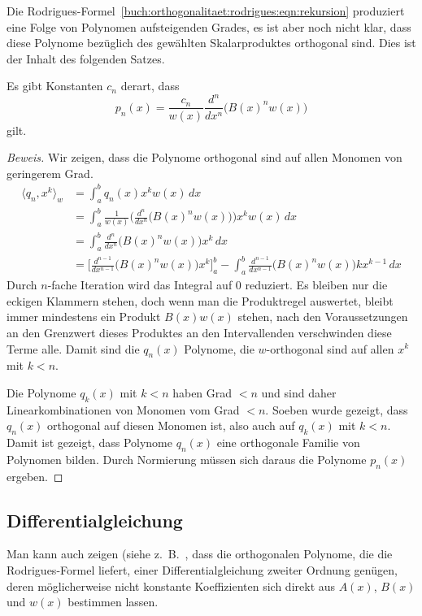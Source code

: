 Die Rodrigues-Formel~\eqref{buch:orthogonalitaet:rodrigues:eqn:rekursion}
produziert eine Folge von Polynomen aufsteigenden Grades, es ist aber
noch nicht klar, dass diese Polynome bezüglich des gewählten Skalarproduktes
orthogonal sind.
Dies ist der Inhalt des folgenden Satzes.

\begin{satz}
%
Es gibt Konstanten $c_n$ derart, dass
\[
p_n(x)
=
\frac{c_n}{w(x)} \frac{d^n}{dx^n} \bigl(B(x)^n w(x)\bigr) 
\]
gilt.
\end{satz}

\begin{proof}[Beweis]
Wir zeigen, dass die Polynome orthogonal sind auf allen Monomen
von geringerem Grad.
\begin{align*}
\langle q_n, x^k\rangle_w
&=
\int_a^b q_n(x)x^kw(x)\,dx
\\
&=
\int_a^b \frac{1}{w(x)}
\biggl(\frac{d^n}{dx^n}\bigl(B(x)^n w(x)\bigr)\biggr)
x^k w(x)\,dx
\\
&=
\int_a^b \frac{d^n}{dx^n}\bigl(B(x)^n w(x)\bigr) x^k \,dx
\\
&=
\biggl[\frac{d^{n-1}}{dx^{n-1}}\bigl(B(x)^n w(x)\bigr) x^k \biggr]_a^b
-
\int_a^b \frac{d^{n-1}}{dx^{n-1}}\bigl(B(x)^n w(x)\bigr)kx^{k-1}\,dx
\end{align*}
Durch $n$-fache Iteration wird das Integral auf $0$ reduziert.
Es bleiben nur die eckigen Klammern stehen, doch wenn man die Produktregel
auswertet, bleibt immer mindestens ein Produkt $B(x)w(x)$ stehen,
nach den Voraussetzungen an den Grenzwert dieses Produktes an den
Intervallenden verschwinden diese Terme alle.
Damit sind die $q_n(x)$ Polynome, die $w$-orthogonal sind auf allen
$x^k$ mit $k<n$.

Die Polynome $q_k(x)$ mit $k< n$ haben Grad $<n$ und sind daher
Linearkombinationen von Monomen vom Grad $<n$.
Soeben wurde gezeigt, dass $q_n(x)$ orthogonal auf diesen Monomen
ist, also auch auf $q_k(x)$ mit $k<n$.
Damit ist gezeigt, dass Polynome $q_n(x)$ eine orthogonale Familie
von Polynomen bilden.
Durch Normierung müssen sich daraus die Polynome $p_n(x)$ ergeben.
\end{proof}

\subsection{Differentialgleichung}
Man kann auch zeigen (siehe z.~B.~\cite{buch:pearsondgl},
dass die orthogonalen Polynome, die die
Rodrigues-Formel liefert, einer Differentialgleichung zweiter 
Ordnung genügen, deren möglicherweise nicht konstante Koeffizienten
sich direkt aus $A(x)$, $B(x)$ und $w(x)$ bestimmen lassen.

